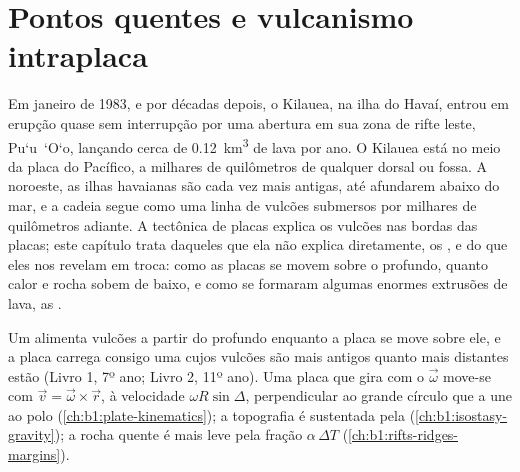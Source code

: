 \chapter{Pontos quentes e vulcanismo intraplaca}\label{ch:b1:hotspots}

Em janeiro de 1983, e por décadas depois, o Kilauea, na ilha do Havaí, entrou em erupção quase sem interrupção por uma abertura em sua zona de rifte leste, Pu\textquoteleft u~\textquoteleft O\textquoteleft o, lançando cerca de
\qty{0.12}{km^3} de lava por ano. O Kilauea está no meio da placa do Pacífico, a milhares de quilômetros de qualquer dorsal ou fossa. A noroeste, as ilhas havaianas são cada vez mais antigas, até afundarem abaixo do mar, e a cadeia segue como uma linha de vulcões submersos por milhares de quilômetros adiante.
A tectônica de placas explica os vulcões nas bordas das placas; este capítulo trata daqueles que ela não explica diretamente, os , e do que eles nos revelam em troca: como as placas se movem sobre o  profundo, quanto calor e rocha sobem de baixo, e como se formaram algumas enormes extrusões de lava, as .

\begin{recall}
Um  alimenta vulcões a partir do  profundo enquanto a placa se move sobre ele, e a placa carrega consigo uma  cujos vulcões são mais antigos quanto mais distantes estão (Livro 1, 7º ano; Livro 2, 11º ano). Uma placa que gira com o  $\vec\omega$ move-se com $\vec v = \vec\omega\times\vec r$, à velocidade $\omega R\sin\Delta$, perpendicular ao grande círculo que a une ao polo
(\cref{ch:b1:plate-kinematics}); a topografia é sustentada pela 
(\cref{ch:b1:isostasy-gravity}); a rocha quente é mais leve pela fração
$\alpha\,\Delta T$ (\cref{ch:b1:rifts-ridges-margins}).
\end{recall}

